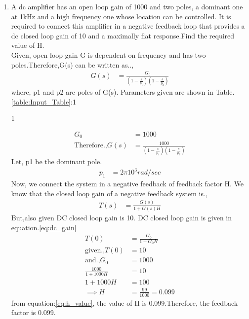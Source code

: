 \begin{enumerate}[label=\thesubsection.\arabic*.,ref=\thesubsection.\theenumi]

\item
A dc amplifier has an open loop gain of 1000 and two poles, a dominant one at 1kHz and a high frequency one whose location can be controlled. It is required to connect this amplifier in a negative feedback loop that provides a dc closed loop gain of 10 and a maximally flat response.Find the required value of H.
\\
\solution Given, open loop gain G is dependent on frequency and has two poles.Therefore,G(s) can be written as..,
\begin{align}
  G(s) &= \frac{G_0}{(1-\frac{s}{p_{1}})(1-\frac{s}{p_{2}})} \label{eq:open_loop_gain} 
\end{align}
where, p1 and p2 are poles of G(s).
Parameters given are shown in Table.\ref{table:Input_Table}:1
\begin{table}[!ht]
\centering

\caption{1}
\label{table:Input_Table}
\end{table}
\begin{align}
    G_0 &= 1000\\
\text{Therefore.,} G(s)&= \frac{1000}{(1-\frac{s}{p_{1}})(1-\frac{s}{p_{2}})}  
\end{align}
Let, p1 be the dominant pole.
\begin{align}
    p_1 &= 2\pi10^3 rad/sec
\end{align}
Now, we connect the system in a negative feedback of feedback factor H.
We know that the closed loop gain of a negative feedback system is.,
\begin{align}
    T(s) &= \frac{G(s)}{1+G(s)H} \label{eq:transfer_function}
\end{align}
But,also given DC closed loop gain is 10. DC closed loop gain is given in equation.\ref{eq:dc_gain} 
\begin{align}
T(0) &= \frac{G_0}{1+G_0H} \label{eq:dc_gain} \\
\text{given.,}T(0)&=10\\
\text{and.,}G_0 &= 1000\\
\frac{1000}{1+1000H} &= 10\\
1+1000H &= 100\\
\implies H &= \frac{99}{1000} = 0.099 \label{eq:h_value}
\end{align}
from equation:\ref{eq:h_value}, the value of H is 0.099.Therefore, the feedback factor is 0.099.

\end{enumerate}
